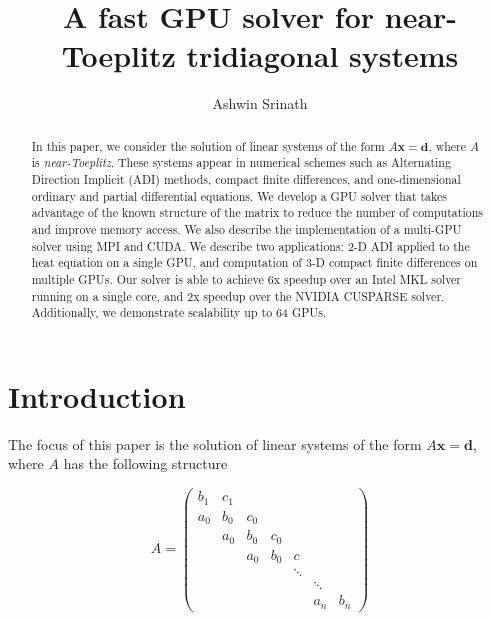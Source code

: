 \documentclass{elsarticle}
\begin{document}
\begin{frontmatter}
\author{Ashwin Srinath}
\title{A fast GPU solver for near-Toeplitz tridiagonal systems}
\maketitle

\begin{abstract}
    In this paper, we consider the solution of linear
    systems of the form $A\bm{x} = \bm{d}$,
    where $A$ is \emph{near-Toeplitz}.
    These systems appear in numerical schemes
    such as
    Alternating Direction Implicit (ADI) methods,
    compact finite differences,
    and one-dimensional ordinary
    and partial differential equations.
    We develop a GPU solver that takes advantage
    of the known structure of the matrix
    to reduce the number of computations
    and improve memory access.
    We also describe the implementation of a multi-GPU solver
    using MPI and CUDA.
    We describe two applications:
    2-D ADI applied to the heat equation on a single GPU,
    and computation of
    3-D compact finite differences on multiple GPUs.
    Our solver is able to achieve 6x speedup
    over an Intel MKL solver running on a single core,
    and 2x speedup
    over the NVIDIA CUSPARSE solver.
    Additionally, we demonstrate scalability up to 64 GPUs.

\end{abstract}

\end{frontmatter}
    
\section{Introduction}

The focus of this paper is the solution of
linear systems of the form $A\bm{x} = \bm{d}$,
where $A$ has the following structure

\begin{equation} \label{eqn:toeplitz-matrix}
A = 
\begin{pmatrix}
     b_1 & c_1  \\
     a_0 & b_0  &  c_0  \\
         & a_0  &  b_0 &  c_0  \\
         &      &  a_0 &  b_0 &  c    \\
         &      &      &      &  \ddots \\
         &      &      &      &     &  \ddots  \\
         &      &      &      &     &  a_n  &  b_n
\end{pmatrix}
\end{equation}
\end{document}
